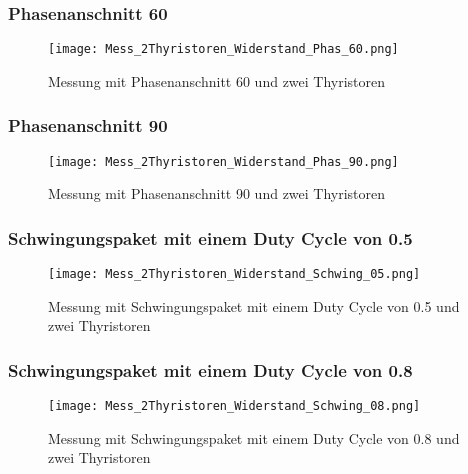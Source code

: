 \begin{appendix}
\subsubsection*{Phasenanschnitt 60\textdegree}

\begin{figure}[ht!]
	\centering
	\texttt{[image: Mess\_2Thyristoren\_Widerstand\_Phas\_60.png]}	
	\caption{Messung mit Phasenanschnitt 60\textdegree \hspace{0.02cm} und zwei Thyristoren}\label{fig:Mess_2Thyristoren_Phas_60grad}
\end{figure}

\subsubsection*{Phasenanschnitt 90\textdegree}

\begin{figure}[ht!]
	\centering
	\texttt{[image: Mess\_2Thyristoren\_Widerstand\_Phas\_90.png]}	
	\caption{Messung mit Phasenanschnitt 90\textdegree \hspace{0.02cm} und zwei Thyristoren}\label{fig:Mess_2Thyristoren_Phas_90grad}
\end{figure}

\newpage
\subsubsection*{Schwingungspaket mit einem Duty Cycle von 0.5}

\begin{figure}[ht!]
	\centering
	\texttt{[image: Mess\_2Thyristoren\_Widerstand\_Schwing\_05.png]}	
	\caption{Messung mit Schwingungspaket mit einem Duty Cycle von 0.5 und zwei Thyristoren}\label{fig:Mess_2Thyristoren_Schwing_50}
\end{figure}


\subsubsection*{Schwingungspaket mit einem Duty Cycle von 0.8}

\begin{figure}[ht!]
	\centering
	\texttt{[image: Mess\_2Thyristoren\_Widerstand\_Schwing\_08.png]}	
	\caption{Messung mit Schwingungspaket mit einem Duty Cycle von 0.8 und zwei Thyristoren}\label{fig:Mess_2Thyristoren_Schwing_80}	
\end{figure}


\end{appendix}
